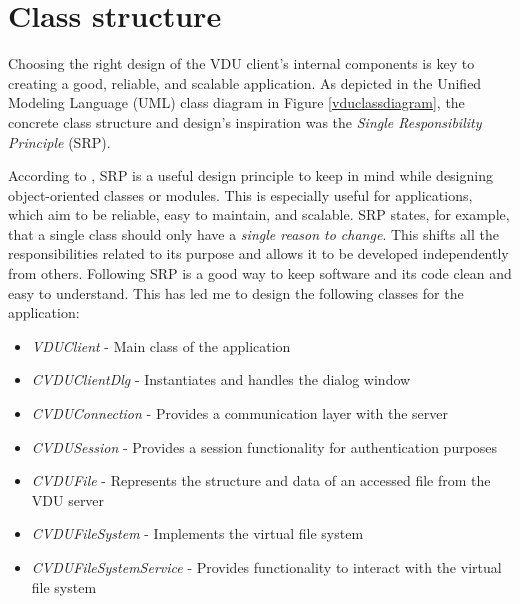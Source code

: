 \section{Class structure}
Choosing the right design of the VDU client's internal components is key to creating a good, reliable, and scalable application. As depicted in the Unified Modeling Language (UML) class diagram in Figure \ref{vduclassdiagram}, the concrete class structure and design's inspiration was the \textit{Single Responsibility Principle} (SRP).

According to \cite{CleanCodeBook}, SRP is a useful design principle to keep in mind while designing object-oriented classes or modules. This is especially useful for applications, which aim to be reliable, easy to maintain, and scalable. SRP states, for example, that a single class should only have a \textit{single reason to change}. This shifts all the responsibilities related to its purpose and allows it to be developed independently from others. Following SRP is a good way to keep software and its code clean and easy to understand. This has led me to design the following classes for the application:
\begin{itemize}
    \item \textit{VDUClient} - Main class of the application
    \item \textit{CVDUClientDlg} - Instantiates and handles the dialog window
    \item \textit{CVDUConnection} - Provides a communication layer with the server
    \item \textit{CVDUSession} - Provides a session functionality for authentication purposes
    \item \textit{CVDUFile} - Represents the structure and data of an accessed file from the VDU server
    \item \textit{CVDUFileSystem} - Implements the virtual file system
    \item \textit{CVDUFileSystemService} - Provides functionality to interact with the virtual file system
\end{itemize}
